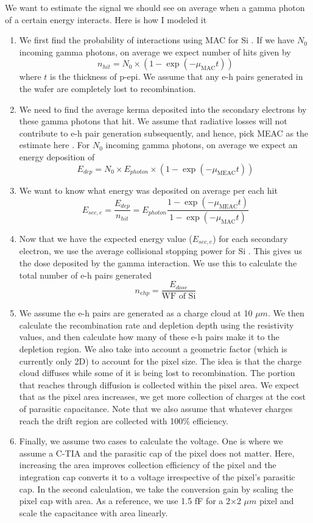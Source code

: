 \documentclass{article}
\begin{document}
We want to estimate the signal we should see on average when a gamma photon of a certain energy interacts. Here is how I modeled it 

\begin{enumerate}
    \item We first find the probability of interactions using MAC for Si \cite{nist}. If we have $N_0$ incoming gamma photons, on average we expect number of hits given by 
    \[n_{hit} = N_0 \times (1-\exp (-\mu_{\text{MAC}}t)) \]
    where $t$ is the thickness of p-epi. We assume that any e-h pairs generated in the wafer are completely lost to recombination.
    \item We need to find the average kerma deposited into the secondary electrons by these gamma photons that hit. We assume that radiative losses will not contribute to e-h pair generation subsequently, 
    and hence, pick MEAC as the estimate here \cite{nist}. For $N_0$ incoming gamma photons, on average we expect an energy deposition of 
    \[E_{dep} = N_0 \times E_{photon} \times (1-\exp (-\mu_{\text{MEAC}}t))\]
    \item We want to know what energy was deposited on average per each hit
    \[E_{sec,e} = \frac{E_{dep}}{n_{hit}} = E_{photon} \frac{ 1-\exp (-\mu_{\text{MEAC}}t)}{1-\exp (-\mu_{\text{MAC}}t)}\]
    \item Now that we have the expected energy value ($E_{sec,e}$) for each secondary electron, we use the average collisional stopping power for Si \cite{STARAppendix2005}.  
    This gives us the dose deposited by the gamma interaction. We use this to calculate the total number of e-h pairs generated
    \[n_{ehp} = \frac{E_{dose}}{\text{WF of Si}}\]
    \item We assume the e-h pairs are generated as a charge cloud at 10 $\mu m$. We then calculate the recombination rate and depletion depth using the resistivity values,
    and then calculate how many of these e-h pairs make it to the depletion region. We also take into account a geometric factor (which is currently only 2D) to account for the pixel size.
    The idea is that the charge cloud diffuses while some of it is being lost to recombination. The portion that reaches through diffusion is collected within the pixel area. We expect that as
    the pixel area increases, we get more collection of charges at the cost of parasitic capacitance. Note that we also assume that whatever charges reach the drift region are collected with 100\% efficiency.
    \item Finally, we assume two cases to calculate the voltage. One is where we assume a C-TIA and the parasitic cap of the pixel does not matter. Here, increasing the area improves collection efficiency 
    of the pixel and the integration cap converts it to a voltage irrespective of the pixel's parasitic cap. In the second calculation, we take the conversion gain by scaling the pixel cap with area. As a reference, we
    use 1.5 fF for a 2$\times$2 $\mu m$ pixel and scale the capacitance with area linearly.




\end{enumerate}
\end{document}
